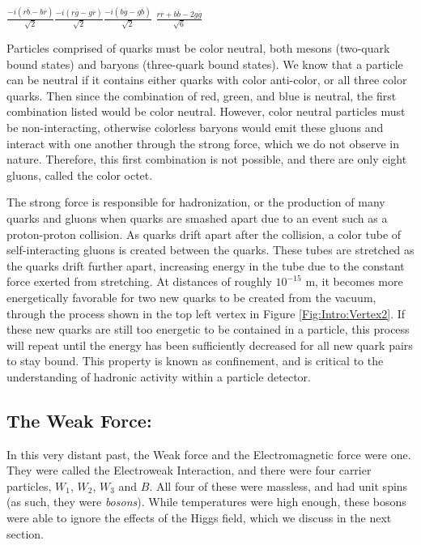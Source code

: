{\centering  

    $\frac{-i(r\overline{b} - b\overline{r})}{\sqrt{2}}$\hspace{1cm}$\frac{-i(r\overline{g} - g\overline{r})}{\sqrt{2}}$\hspace{1cm}$\frac{-i(b\overline{g} - g\overline{b})}{\sqrt{2}}$ \hspace{1cm}$\frac{r\overline{r} + b\overline{b} -2g\overline{g}}{\sqrt{6}}$
    
    }

Particles comprised of quarks must be color neutral, both mesons (two-quark bound states) and baryons (three-quark bound states). We know that a particle can be neutral if it contains either quarks with color anti-color, or all three color quarks. Then since the combination of red, green, and blue is neutral, the first combination listed would be color neutral. However, color neutral particles must be non-interacting, otherwise colorless baryons would emit these gluons and interact with one another through the strong force, which we do not observe in nature. Therefore, this first combination is not possible, and there are only eight gluons, called the color octet.

The strong force is responsible for hadronization, or the production of many quarks and gluons when quarks are smashed apart due to an event such as a proton-proton collision. As quarks drift apart after the collision, a color tube of self-interacting gluons is created between the quarks. These tubes are stretched as the quarks drift further apart, increasing energy in the tube due to the constant force exerted from stretching. At distances of roughly $10^{-15}$ m, it becomes more energetically favorable for two new quarks to be created from the vacuum, through the process shown in the top left vertex in Figure \ref{Fig:Intro:Vertex2}. If these new quarks are still too energetic to be contained in a particle, this process will repeat until the energy has been sufficiently decreased for all new quark pairs to stay bound. This property is known as confinement, and is critical to the understanding of hadronic activity within a particle detector.

\subsection{The Weak Force:}
In this very distant past, the Weak force and the Electromagnetic force were one. They were called the Electroweak Interaction, and there were four carrier particles, $W_1$, $W_2$, $W_3$ and $B$. All four of these were massless, and had unit spins (as such, they were \textit{bosons}). While temperatures were high enough, these bosons were able to ignore the effects of the Higgs field, which we discuss in the next section.

